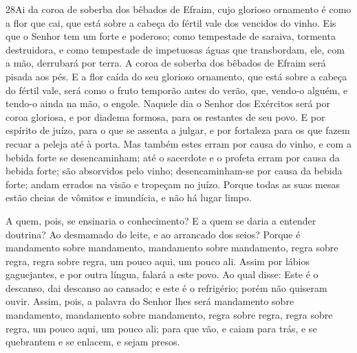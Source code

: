 \lettrine{28}{}Ai da coroa de soberba dos bêbados de Efraim,
cujo glorioso ornamento é como a flor que cai, que está sobre a
cabeça do fértil vale dos vencidos do vinho. Eis que o Senhor
tem um forte e poderoso; como tempestade de saraiva, tormenta
destruidora, e como tempestade de impetuosas águas que transbordam,
ele, com a mão, derrubará por terra. A coroa de soberba dos
bêbados de Efraim será pisada aos pés. E a flor caída do seu
glorioso ornamento, que está sobre a cabeça do fértil vale, será
como o fruto temporão antes do verão, que, vendo-o alguém, e tendo-o
ainda na mão, o engole. Naquele dia o Senhor dos Exércitos será
por coroa gloriosa, e por diadema formosa, para os restantes de seu
povo. E por espírito de juízo, para o que se assenta a julgar, e
por fortaleza para os que fazem recuar a peleja até à porta. Mas
também estes erram por causa do vinho, e com a bebida forte se
desencaminham; até o sacerdote e o profeta erram por causa da bebida
forte; são absorvidos pelo vinho; desencaminham-se por causa da
bebida forte; andam errados na visão e tropeçam no juízo. Porque
todas as suas mesas estão cheias de vômitos e imundícia, e não há
lugar limpo.

A quem, pois, se ensinaria o conhecimento? E a quem se daria a
entender doutrina? Ao desmamado do leite, e ao arrancado dos seios?
Porque é mandamento sobre mandamento, mandamento sobre
mandamento, regra sobre regra, regra sobre regra, um pouco aqui, um
pouco ali. Assim por lábios gaguejantes, e por outra língua,
falará a este povo. Ao qual disse: Este é o descanso, dai
descanso ao cansado; e este é o refrigério; porém não quiseram
ouvir. Assim, pois, a palavra do Senhor lhes será mandamento
sobre mandamento, mandamento sobre mandamento, regra sobre regra,
regra sobre regra, um pouco aqui, um pouco ali; para que vão, e
caiam para trás, e se quebrantem e se enlacem, e sejam presos.

